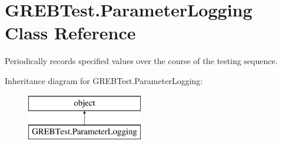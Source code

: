 \hypertarget{class_g_r_e_b_test_1_1_parameter_logging}{}\section{G\+R\+E\+B\+Test.\+Parameter\+Logging Class Reference}
\label{class_g_r_e_b_test_1_1_parameter_logging}


Periodically records specified values over the course of the testing sequence.  


Inheritance diagram for G\+R\+E\+B\+Test.\+Parameter\+Logging\+:\begin{figure}[H]
\begin{center}
\leavevmode
\includegraphics[height=2.000000cm]{class_g_r_e_b_test_1_1_parameter_logging}
\end{center}
\end{figure}
